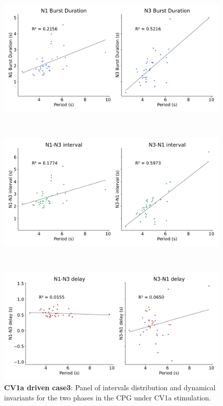 \begin{figure}[htbp]
\begin{minipage}[b]{0.55\textwidth}
		\begin{minipage}[b]{\textwidth}
			\centering
			\includegraphics[width=\textwidth]{./invariants/data/SUSSEX/CV1a_driven3/images/stim_cv1a3_durations.pdf}
		\end{minipage}\\
		\begin{minipage}[b]{\textwidth}
			\centering
			\includegraphics[width=\textwidth]{./invariants/data/SUSSEX/CV1a_driven3/images/stim_cv1a3_intervals.pdf}
		\end{minipage}\\
		\begin{minipage}[b]{\textwidth}
			\centering
			\includegraphics[width=\textwidth]{./invariants/data/SUSSEX/CV1a_driven3/images/stim_cv1a3_delays.pdf}
		\end{minipage}
	\end{minipage}
	\caption{\textbf{CV1a driven case3}: Panel of intervals distribution and dynamical invariants for the two phases in the CPG under CV1a stimulation.}
	\label{fig:cv1a 3 2phases}
\end{figure}



